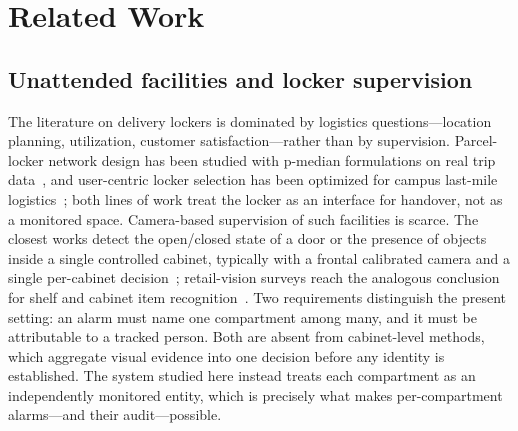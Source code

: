 \documentclass[journal,article,submit,oneauthor]{Definitions/mdpi}
\begin{document}
\section{Related Work}
\label{sec:related}

\subsection{Unattended facilities and locker supervision}
The literature on delivery lockers is dominated by logistics questions---location planning,
utilization, customer satisfaction---rather than by supervision. Parcel-locker network design
has been studied with p-median formulations on real trip data~\cite{li2025parcel}, and
user-centric locker selection has been optimized for campus last-mile
logistics~\cite{zhang2025campus}; both lines of work treat the locker as an interface for
handover, not as a monitored space. Camera-based supervision of such facilities is scarce.
The closest works detect the open/closed state of a door or the presence of objects inside a
single controlled cabinet, typically with a frontal calibrated camera and a single
per-cabinet decision~\cite{ramoa2021door}; retail-vision surveys reach the analogous
conclusion for shelf and cabinet item recognition~\cite{santra2019retail}. Two requirements
distinguish the present setting: an alarm must name one compartment among many, and it must
be attributable to a tracked person. Both are absent from cabinet-level methods, which
aggregate visual evidence into one decision before any identity is established. The system
studied here instead treats each compartment as an independently monitored entity, which is
precisely what makes per-compartment alarms---and their audit---possible.
\end{document}
